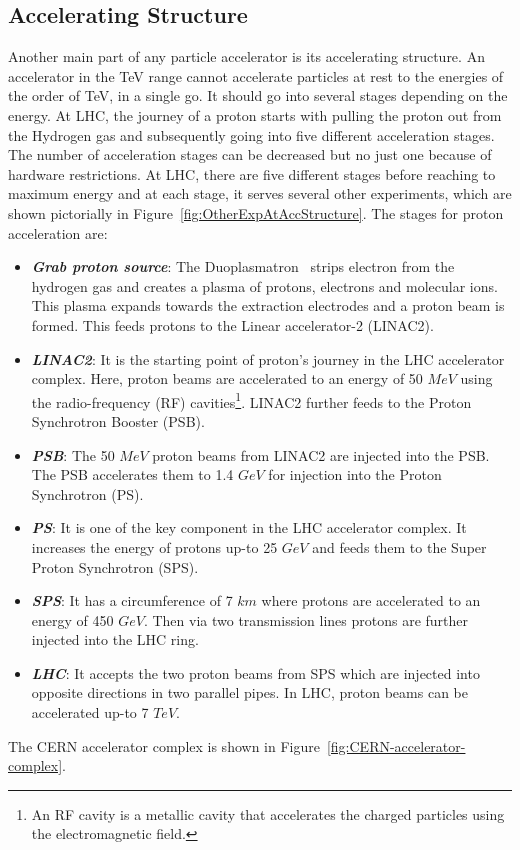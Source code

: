 {{{%
\subsection{Accelerating Structure} %
\label{sub:accelerating_structure}

Another main part of any particle accelerator is its accelerating structure. An accelerator in the TeV range cannot accelerate particles at rest to the energies of the order of TeV, in a single go.  It should go into several stages depending on the energy. At LHC, the journey of a proton starts with pulling the proton out from the Hydrogen gas and subsequently going into five different acceleration stages. The number of acceleration stages can be decreased but no just one because of hardware restrictions. At LHC, there are five different stages before reaching to maximum energy and at each stage, it serves several other experiments, which are shown pictorially in Figure~\ref{fig:OtherExpAtAccStructure}. The stages for proton acceleration are:
\begin{itemize}
    \item {\textit {\textbf {Grab proton source}}}: The Duoplasmatron~\cite{LHC-tdr-vol3} strips electron from the hydrogen gas and creates a plasma of protons, electrons and molecular ions. This plasma expands towards the extraction electrodes and a proton beam is formed. This feeds protons to the Linear accelerator-2 (LINAC2).
    \item {\textit {\textbf {LINAC2}}}: It is the starting point of proton's journey in the LHC accelerator complex. Here, proton beams are accelerated to an energy of 50 $MeV$ using the radio-frequency (RF) cavities\footnote{An RF cavity is a metallic cavity that accelerates the charged particles using the electromagnetic field.}. LINAC2 further feeds to the Proton Synchrotron Booster (PSB).
    \item {\textit {\textbf {PSB}}}: The 50 $MeV$ proton beams from LINAC2 are injected into the PSB. The PSB accelerates them to 1.4 $GeV$ for injection into the Proton Synchrotron (PS).
    \item {\textit {\textbf {PS}}}: It is one of the key component in the LHC accelerator complex. It increases the energy of protons up-to 25 $GeV$ and feeds them to the Super Proton Synchrotron (SPS).
    \item {\textit {\textbf {SPS}}}: It has a circumference of 7 $km$ where protons are accelerated to an energy of 450 $GeV$. Then via two transmission lines protons are further injected into the LHC ring.
    \item {\textit {\textbf {LHC}}}: It accepts the two proton beams from SPS which are injected into opposite directions in two parallel pipes. In LHC, proton beams can be accelerated up-to 7 $TeV$.
\end{itemize}
The CERN accelerator complex is shown in Figure~\ref{fig:CERN-accelerator-complex}.  

}}}
